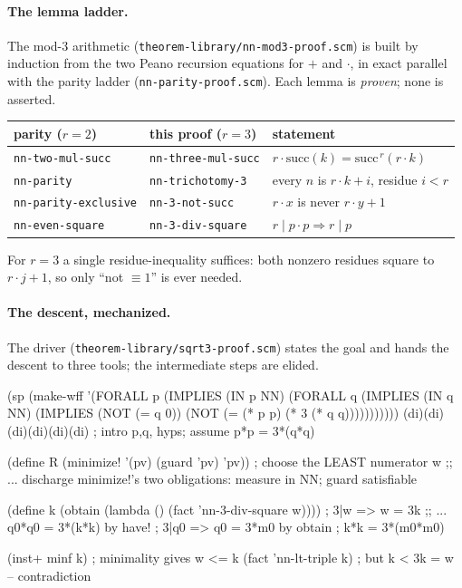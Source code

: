 \paragraph{The lemma ladder.}
The mod-$3$ arithmetic (\texttt{theorem-library/nn-mod3-proof.scm}) is built by
induction from the two Peano recursion equations for $+$ and $\cdot$, in exact
parallel with the parity ladder (\texttt{nn-parity-proof.scm}).  Each lemma is
\emph{proven}; none is asserted.

\begin{center}
\begin{tabular}{lll}
\toprule
parity ($r=2$) & this proof ($r=3$) & statement \\
\midrule
\texttt{nn-two-mul-succ}     & \texttt{nn-three-mul-succ} & $r\cdot\mathrm{succ}(k) = \mathrm{succ}^{\,r}(r\cdot k)$ \\
\texttt{nn-parity}           & \texttt{nn-trichotomy-3}   & every $n$ is $r\cdot k + i$, residue $i<r$ \\
\texttt{nn-parity-exclusive} & \texttt{nn-3-not-succ}     & $r\cdot x$ is never $r\cdot y + 1$ \\
\texttt{nn-even-square}      & \texttt{nn-3-div-square}   & $r \mid p\cdot p \Rightarrow r \mid p$ \\
\bottomrule
\end{tabular}
\end{center}

\noindent For $r=3$ a single residue-inequality suffices: both nonzero residues
square to $r\cdot j + 1$, so only ``not $\equiv 1$'' is ever needed.

\paragraph{The descent, mechanized.}
The driver (\texttt{theorem-library/sqrt3-proof.scm}) states the goal and hands
the descent to three tools; the intermediate steps are elided.

\begin{VNBcode}
(sp (make-wff '(FORALL p (IMPLIES (IN p NN) (FORALL q (IMPLIES (IN q NN)
     (IMPLIES (NOT (= q 0)) (NOT (= (* p p) (* 3 (* q q)))))))))))
(di)(di)(di)(di)(di)(di)                 ; intro p,q, hyps; assume p*p = 3*(q*q)

(define R (minimize! '(pv) (guard 'pv) 'pv))    ; choose the LEAST numerator w
;; ... discharge minimize!'s two obligations: measure in NN; guard satisfiable

(define k (obtain (lambda () (fact 'nn-3-div-square w))))   ; 3|w  =>  w = 3k
;; ... q0*q0 = 3*(k*k) by have! ; 3|q0 => q0 = 3*m0 by obtain ; k*k = 3*(m0*m0)

(inst+ minf k)              ; minimality gives  w <= k
(fact 'nn-lt-triple k)      ; but k < 3k = w -- contradiction
\end{VNBcode}

